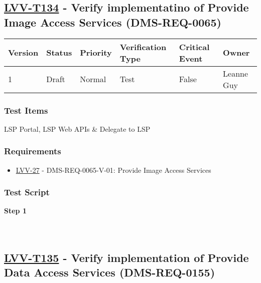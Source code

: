 \hypertarget{lvv-t134---verify-implementatino-of-provide-image-access-services-dms-req-0065}{%
\subsection{\texorpdfstring{\href{https://jira.lsstcorp.org/secure/Tests.jspa\#/testCase/LVV-T134}{LVV-T134}
- Verify implementatino of Provide Image Access Services
(DMS-REQ-0065)}{LVV-T134 - Verify implementatino of Provide Image Access Services (DMS-REQ-0065)}}\label{lvv-t134---verify-implementatino-of-provide-image-access-services-dms-req-0065}}

\begin{longtable}[]{@{}llllll@{}}
\toprule
Version & Status & Priority & Verification Type & Critical Event &
Owner\tabularnewline
\midrule
\endhead
1 & Draft & Normal & Test & False & Leanne Guy\tabularnewline
\bottomrule
\end{longtable}

\hypertarget{test-items-110}{%
\subsubsection{Test Items}\label{test-items-110}}

LSP Portal, LSP Web APIs \& Delegate to LSP

\hypertarget{requirements-111}{%
\subsubsection{Requirements}\label{requirements-111}}

\begin{itemize}
\tightlist
\item
  \href{https://jira.lsstcorp.org/browse/LVV-27}{LVV-27} -
  DMS-REQ-0065-V-01: Provide Image Access Services
\end{itemize}

\hypertarget{test-script-111}{%
\subsubsection{Test Script}\label{test-script-111}}

\textbf{Step 1}\\
~\\
~\\

\hypertarget{lvv-t135---verify-implementation-of-provide-data-access-services-dms-req-0155}{%
\subsection{\texorpdfstring{\href{https://jira.lsstcorp.org/secure/Tests.jspa\#/testCase/LVV-T135}{LVV-T135}
- Verify implementation of Provide Data Access Services
(DMS-REQ-0155)}{LVV-T135 - Verify implementation of Provide Data Access Services (DMS-REQ-0155)}}\label{lvv-t135---verify-implementation-of-provide-data-access-services-dms-req-0155}}

